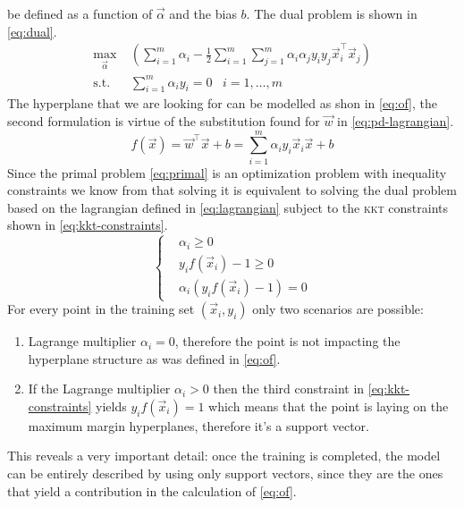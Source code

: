 be defined as a function of $\vec{\alpha}$ and the bias $b$. The dual problem is shown in \cref{eq:dual}.
\begin{equation}
	\label{eq:dual}
	\begin{aligned}
		\max_{\vec{\alpha}} & \left(\sum_{i = 1}^{m}{\alpha_i} - \frac{1}{2}\sum_{i =
		1}^{m}\sum_{j = 1}^{m}{\alpha_i\alpha_j y_i y_j \vec{x}_i^\top\vec{x}_j}\right)       \\
		 \text{s.t.} \hspace{10pt} & \sum_{i = 1}^{m}{\alpha_i y_i} = 0 \hspace{10pt} i = 1, \ldots, m
	\end{aligned}
\end{equation}
The hyperplane that we are looking for can be modelled as shon in \cref{eq:of}, the second
formulation is virtue of the substitution found for $\vec{w}$ in \cref{eq:pd-lagrangian}.
\begin{equation}
	\label{eq:of}
	f(\vec{x}) = \vec{w}^\top\vec{x} + b = \sum_{i = 1}^m\alpha_iy_i\vec{x}_i\vec{x} + b
\end{equation}
Since the primal problem \cref{eq:primal} is an optimization problem with inequality constraints we
know from \cite{kkt1951} that solving it is equivalent to solving the dual problem based on the
lagrangian defined in \cref{eq:lagrangian} subject to the \textsc{kkt} constraints shown in
\cref{eq:kkt-constraints}.
\begin{equation}
	\label{eq:kkt-constraints}
	\begin{cases}
		 & \alpha_i \geq 0                   \\
		 & y_if(\vec{x}_i) - 1 \geq 0        \\
		 & \alpha_i(y_if(\vec{x}_i) - 1) = 0
	\end{cases}
\end{equation}
For every point in the training set $(\vec{x}_i, y_i)$ only two scenarios are possible:
\begin{enumerate}
	\item Lagrange multiplier $\alpha_i = 0$, therefore the point is not impacting the
	      hyperplane structure as was defined in \cref{eq:of}.
	\item If the Lagrange multiplier $\alpha_i > 0$ then the third constraint in
	      \cref{eq:kkt-constraints} yields $y_if(\vec{x}_i) = 1$ which means that the point is
	      laying on the maximum margin hyperplanes, therefore it's a support vector.
\end{enumerate}
This reveals a very important detail: once the training is completed, the model can be entirely
described by using only support vectors, since they are the ones that yield a contribution in the
calculation of \cref{eq:of}.

